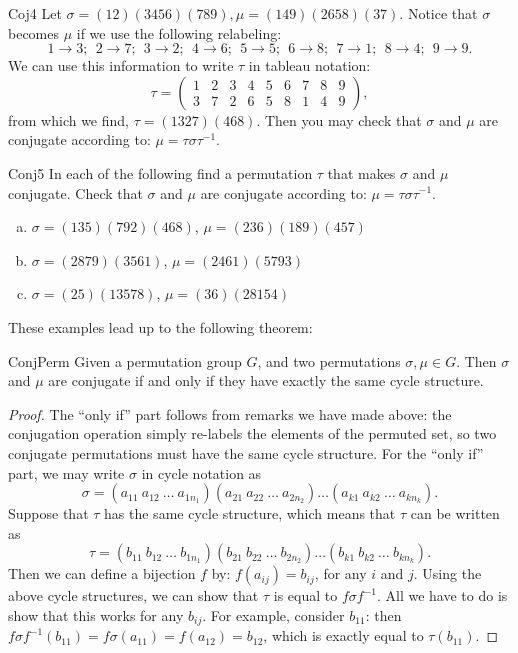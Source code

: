 \begin{example}{Coj4}
Let $\sigma = (12)(3456)(789), \mu = (149)(2658)(37)$.  Notice that $\sigma$ becomes $\mu$ if we use the following relabeling:
$$ 1 \rightarrow 3;~~2 \rightarrow 7;~~3\rightarrow 2;~~4\rightarrow 6;~~5\rightarrow 5;~~6\rightarrow 8;~~7\rightarrow 1;~~8\rightarrow 4;~~9\rightarrow 9.$$
We can use this information to write $\tau$ in tableau notation:
$$ \tau =\begin{pmatrix} 1&2&3&4&5&6&7&8&9 \\ 3&7&2&6&5&8&1&4&9 \end{pmatrix}, $$
from which we find, $\tau=(1327)(468)$.  Then you may check that $\sigma$ and $\mu$ are conjugate according to: $\mu = \tau \sigma \tau^{-1}$.
\end{example}
\begin{exercise}{Conj5}
In each of the following find a permutation $\tau$ that makes $\sigma$ and $\mu$ conjugate.  Check that $\sigma$ and $\mu$ are conjugate according to: $\mu = \tau \sigma \tau^{-1}$.

\begin{enumerate}[(a)]
\item $\sigma=(135)(792)(468)$, $\mu=(236)(189)(457)$
\item $\sigma=(2879)(3561)$, $\mu=(2461)(5793)$
\item $\sigma=(25)(13578)$, $\mu=(36)(28154)$
\end{enumerate}
\end{exercise}
These examples lead up to the following theorem:

\begin{prop}{ConjPerm} Given a permutation group $G$, and two permutations $\sigma, \mu \in G$.  Then $\sigma$ and $\mu$ are conjugate if and only if they have exactly the same cycle structure.
\end{prop}
\begin{proof}
The ``only if'' part follows from remarks we have made above: the conjugation operation simply re-labels the elements of the permuted set, so two conjugate permutations must have the same cycle structure.
For the ``only if'' part, we may write $\sigma$ in cycle notation as
$$\sigma = (a_{11}~a_{12}~\ldots~a_{1n_1})(a_{21}~a_{22}~\ldots~a_{2n_2})  \ldots(a_{k1}~a_{k2}~\ldots~a_{k n_k}).$$  
Suppose that $\tau$ has the same cycle structure, which means that $\tau$ can be written as
$$\tau = (b_{11}~b_{12}~\ldots~b_{1n_1})(b_{21}~b_{22}~\ldots~b_{2n_2})  \ldots(b_{k1}~b_{k2}~\ldots~b_{k n_k}).$$
Then we can define a bijection $f$ by: $f(a_{ij}) = b_{ij}$, for any $i$ and $j$. Using the above cycle structures, we can show that $\tau$ is equal to $f \sigma f^{-1}$.  All we have to do is show that this works for any $ b_{ij}$.  For example, consider $b_{11}$: then $f \sigma f^{-1}( b_{11}) = f \sigma ( a_{11}) = f ( a_{12})= b_{12}$, which is exactly equal to $ \tau(b_{11})$.
\end{proof}

